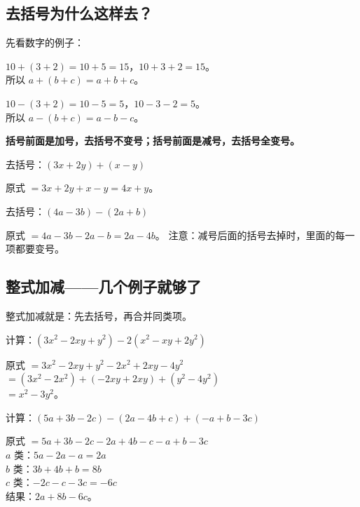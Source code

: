 
\subsection*{去括号为什么这样去？}

先看数字的例子：

$10 + (3 + 2) = 10 + 5 = 15$，$10 + 3 + 2 = 15$。\\
所以 $a + (b + c) = a + b + c$。

$10 - (3 + 2) = 10 - 5 = 5$，$10 - 3 - 2 = 5$。\\
所以 $a - (b + c) = a - b - c$。

\textbf{括号前面是加号，去括号不变号；括号前面是减号，去括号全变号。}

\begin{example}
去括号：$(3x + 2y) + (x - y)$
\end{example}
\begin{solution}
原式 $= 3x + 2y + x - y = 4x + y$。
\end{solution}

\begin{example}
去括号：$(4a - 3b) - (2a + b)$
\end{example}
\begin{solution}
原式 $= 4a - 3b - 2a - b = 2a - 4b$。
注意：减号后面的括号去掉时，里面的每一项都要变号。
\end{solution}

\subsection*{整式加减——几个例子就够了}

整式加减就是：先去括号，再合并同类项。

\begin{example}
计算：$(3x^2 - 2xy + y^2) - 2(x^2 - xy + 2y^2)$
\end{example}
\begin{solution}
原式 $= 3x^2 - 2xy + y^2 - 2x^2 + 2xy - 4y^2$\\
$= (3x^2 - 2x^2) + (-2xy + 2xy) + (y^2 - 4y^2)$\\
$= x^2 - 3y^2$。
\end{solution}

\begin{example}
计算：$(5a + 3b - 2c) - (2a - 4b + c) + (-a + b - 3c)$
\end{example}
\begin{solution}
原式 $= 5a + 3b - 2c - 2a + 4b - c - a + b - 3c$\\
$a$ 类：$5a - 2a - a = 2a$\\
$b$ 类：$3b + 4b + b = 8b$\\
$c$ 类：$-2c - c - 3c = -6c$\\
结果：$2a + 8b - 6c$。
\end{solution}

